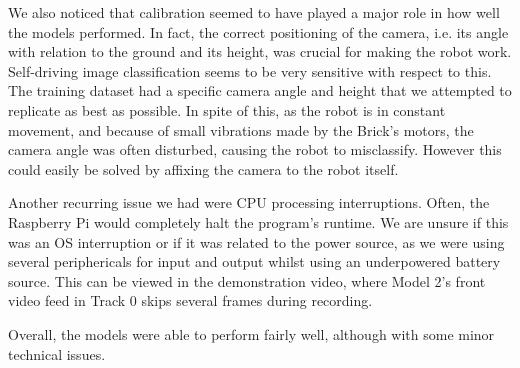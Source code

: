We also noticed that calibration seemed to have played a major role in how well the models
performed.  In fact, the correct positioning of the camera, i.e. its angle with relation to the
ground and its height, was crucial for making the robot work. Self-driving image classification
seems to be very sensitive with respect to this. The training dataset had a specific camera angle
and height that we attempted to replicate as best as possible. In spite of this, as the robot is in
constant movement, and because of small vibrations made by the Brick's motors, the camera angle was
often disturbed, causing the robot to misclassify. However this could easily be solved by affixing
the camera to the robot itself.

Another recurring issue we had were CPU processing interruptions. Often, the Raspberry Pi would
completely halt the program's runtime.  We are unsure if this was an OS interruption or if it was
related to the power source, as we were using several periphericals for input and output whilst
using an underpowered battery source. This can be viewed in the demonstration video, where Model
2's front video feed in Track 0 skips several frames during recording.

Overall, the models were able to perform fairly well, although with some minor technical issues.
